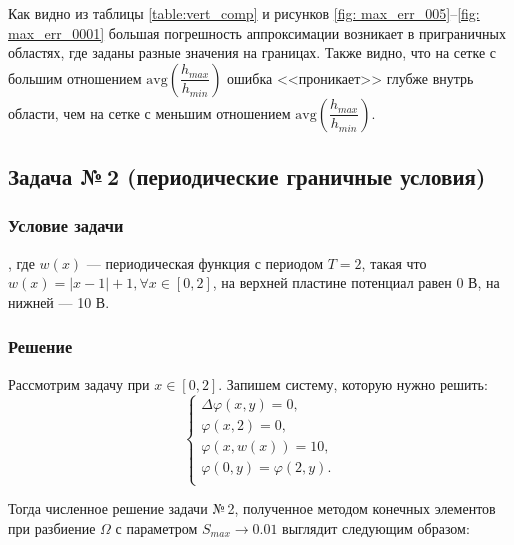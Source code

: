 \documentclass[12pt, a4paper]{article}
\renewcommand{\phi}{\varphi}
\begin{document}
			
			
			Как видно из таблицы \ref{table:vert_comp} и рисунков \ref{fig: max_err_005}--\ref{fig: max_err_0001} большая погрешность аппроксимации возникает в приграничных областях, где заданы разные значения на границах. Также видно, что на сетке с большим отношением  $\mathrm{avg} \left( \dfrac{h_{max}}{h_{min}} \right) $ ошибка <<проникает>> глубже внутрь области, чем на сетке с меньшим отношением $\mathrm{avg} \left( \dfrac{h_{max}}{h_{min}} \right) $. 
			
	
	\newpage
	\subsection{Задача №\,2 (периодические граничные условия)}
		\subsubsection{Условие задачи}
			, где $w(x)$ --- периодическая функция с периодом $T = 2$, такая что $w(x) = |x - 1| + 1, \forall x \in \left[ 0, 2 \right]$, на верхней пластине потенциал равен 0 В, на нижней --- 10 В.
		\subsubsection{Решение}
			Рассмотрим задачу при $x \in \left[ 0, 2 \right]$. Запишем систему, которую нужно решить:
			\begin{equation*}
				\begin{cases}
					\Delta \phi (x, y)  = 0, \\
					\phi (x, 2) = 0, \\
					\phi (x, w(x)) = 10, \\
					\phi (0, y) = \phi (2, y).\\
				\end{cases}
			\end{equation*}
			
			Тогда численное решение задачи №\,2, полученное методом конечных элементов при разбиение $\Omega$ с параметром $S_{max} \rightarrow 0.01$ выглядит следующим образом: 

			
\end{document}

